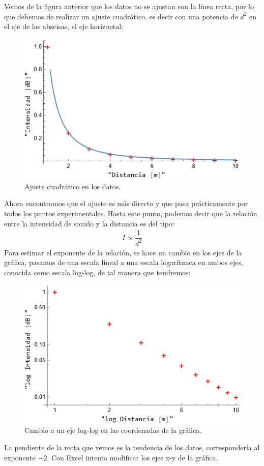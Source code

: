 \documentclass[14pt]{extarticle}
\begin{document}
Vemos de la figura anterior que los datos no se ajustan con la línea recta, por lo que debemos de realizar un ajuste cuadrático, es decir con una potencia de $d^{2}$ en el eje de las abscisas, el eje horizontal:
\begin{figure}[H]
     \centering
     \includegraphics[scale=0.8]{Imagenes/Cuadrado_inverso_03.png}
     \caption{Ajuste cuadrático en los datos.}
\end{figure}
Ahora encontramos que el ajuste es más directo y que pasa prácticamente por todos los puntos experimentales. Hasta este punto, podemos decir que la relación entre la intensidad de sonido y la distancia es del tipo:
\begin{align*}
I \propto \dfrac{1}{d^{2}}
\end{align*}
Para estimar el exponente de la relación, se hace un cambio en los ejes de la gráfica, pasamos de una escala lineal a una escala logarítmica en ambos ejes, conocida como escala log-log, de tal manera que tendremos:
\begin{figure}[H]
     \centering
     \includegraphics[scale=0.8]{Imagenes/Cuadrado_inverso_04.png}
     \caption{Cambio a un eje log-log en las coordenadas de la gráfica.}
\end{figure}
La pendiente de la recta que vemos es la tendencia de los datos, correspondería al exponente $-2$. Con Excel intenta modificar los ejes x-y de la gráfica. 
\end{document}
